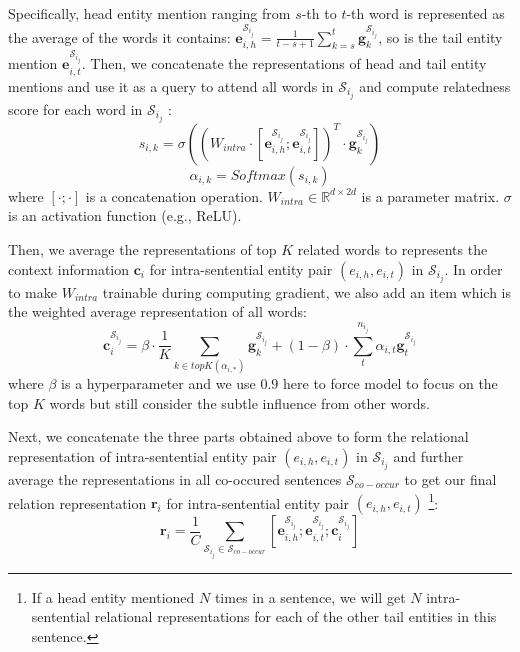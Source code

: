 \documentclass[11pt,a4paper]{article}
\begin{document}
Specifically, head entity mention ranging from $s$-th to $t$-th word is represented as the average of the words it contains: $\textbf{e}^{\mathcal{S}_{i_j}}_{i,h} = \frac{1}{t-s+1} \sum^{t}_{k=s}\textbf{g}^{\mathcal{S}_{i_j}}_{k}$, so is the tail entity mention $\textbf{e}^{\mathcal{S}_{i_j}}_{i,t}$. 
Then, we concatenate the representations of head and tail entity mentions and use it as a query to attend all words in $\mathcal{S}_{i_j}$ and compute relatedness score for each word in $\mathcal{S}_{i_j}$ :
\begin{equation}
s_{i,k} = \sigma((W_{intra} \cdot [\textbf{e}^{\mathcal{S}_{i_j}}_{i,h}; \textbf{e}^{\mathcal{S}_{i_j}}_{i,t}])^T \cdot \textbf{g}^{\mathcal{S}_{i_j}}_k)
\end{equation}
\begin{equation}
    \alpha_{i,k} = Softmax(s_{i,k})
\end{equation}
where $[\cdot;\cdot]$ is a concatenation operation. $W_{intra} \in \mathbb{R}^{d \times 2d}$ is a parameter matrix. $\sigma$ is an activation function (e.g., ReLU).

Then, we average the representations of top $K$ related words to represents the context information $\textbf{c}_{i}$ for intra-sentential entity pair $(e_{i,h}, e_{i,t})$ in $\mathcal{S}_{i_j}$. In order to make $W_{intra}$ trainable during computing gradient, we also add an item which is the weighted average representation of all words:
\begin{equation}
    \textbf{c}^{\mathcal{S}_{i_j}}_{i} = \beta \cdot \frac{1}{K}\sum_{k \in topK(\alpha_{i,*})} \textbf{g}^{\mathcal{S}_{i_j}}_k + (1 - \beta) \cdot \sum^{n_{i_j}}_{t} \alpha_{i,t} \textbf{g}^{\mathcal{S}_{i_j}}_t
    \label{equation:topk}
\end{equation}
where $\beta$ is a hyperparameter and we use $0.9$ here to force model to focus on the top $K$ words but still consider the subtle influence from other words.

Next, we concatenate the three parts obtained above to form the relational representation of intra-sentential entity pair $(e_{i,h}, e_{i,t})$ in $\mathcal{S}_{i_j}$ and further average the representations in all co-occured sentences $\mathcal{S}_{co-occur}$ to get our final relation representation $\textbf{r}_{i}$ for intra-sentential entity pair $(e_{i,h}, e_{i,t})$ \footnote{If a head entity mentioned $N$ times in a sentence, we will get $N$ intra-sentential relational representations for each of the other tail entities in this sentence.}:
\begin{equation}
    \textbf{r}_{i} = \frac{1}{C} \sum_{\mathcal{S}_{i_j} \in {\mathcal{S}_{co-occur}}} [\textbf{e}^{\mathcal{S}_{i_j}}_{i,h}; \textbf{e}^{\mathcal{S}_{i_j}}_{i,t}; \textbf{c}^{\mathcal{S}_{i_j}}_{i}]
    \label{eq-6}
\end{equation}
\end{document}
